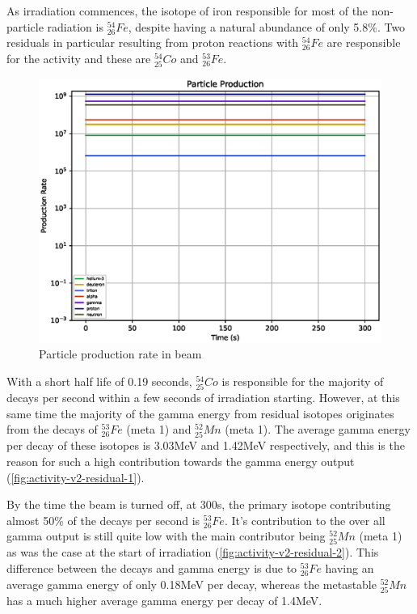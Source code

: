 As irradiation commences, the isotope of iron responsible for most of the non-particle radiation is ${}^{54}_{26} Fe$, despite having a natural abundance of only 5.8\%.  Two residuals in particular resulting from proton reactions with ${}^{54}_{26} Fe$ are responsible for the activity and these are ${}^{54}_{25}Co$ and ${}^{53}_{26}Fe$.  

\begin{figure}[htb]
\centering
\includegraphics[width=0.5\linewidth]{chapters/activity_code/fe-activity-v2/particle_production_in_beam.eps}
\caption{Particle production rate in beam}
\label{fig:activity-v2-particle-production}
\end{figure}

With a short half life of 0.19 seconds, ${}^{54}_{25}Co$ is responsible for the majority of decays per second within a few seconds of irradiation starting.  However, at this same time the majority of the gamma energy from residual isotopes originates from the decays of ${}^{53}_{26}Fe$ (meta 1) and  ${}^{52}_{25}Mn$ (meta 1).  The average gamma energy per decay of these isotopes is 3.03MeV and 1.42MeV respectively, and this is the reason for such a high contribution towards the gamma energy output (\ref{fig:activity-v2-residual-1}).

By the time the beam is turned off, at 300s, the primary isotope contributing almost 50\% of the decays per second is ${}^{53}_{26}Fe$.  It's contribution to the over all gamma output is still quite low with the main contributor being ${}^{52}_{25}Mn$ (meta 1) as was the case at the start of irradiation (\ref{fig:activity-v2-residual-2}).  This difference between the decays and gamma energy is due to ${}^{53}_{26} Fe$ having an average gamma energy of only 0.18MeV per decay, whereas the metastable ${}^{52}_{25} Mn$ has a much higher average gamma energy per decay of 1.4MeV.

